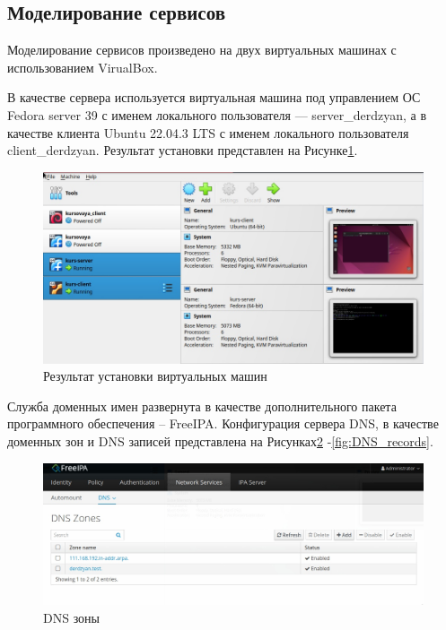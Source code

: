 \subsection{Моделирование сервисов}

Моделирование сервисов произведено на двух виртуальных машинах с использованием VirualBox.

В качестве сервера используется виртуальная машина под управлением ОС Fedora server 39 с именем локального пользователя --- server\_derdzyan, а в качестве клиента Ubuntu 22.04.3 LTS с именем локального пользователя client\_derdzyan. Результат установки представлен на Рисунке\;\ref{fig:VMs}.

\begin{figure}[H]
\centering
\includegraphics[scale=0.3]{../misc/VMs.jpg}
\caption{Результат установки виртуальных машин\label{fig:VMs}}
\end{figure}

Служба доменных имен развернута в качестве дополнительного пакета программного обеспечения -- FreeIPA. Конфигурация сервера DNS, в качестве доменных зон и DNS записей представлена на Рисунках\;\ref{fig:DNS_zones} -\;\ref{fig:DNS_records}.

\begin{figure}[H]
\centering
\includegraphics[scale=0.3]{../misc/DNS_zones.jpg}
\caption{DNS зоны\label{fig:DNS_zones}}
\end{figure}

